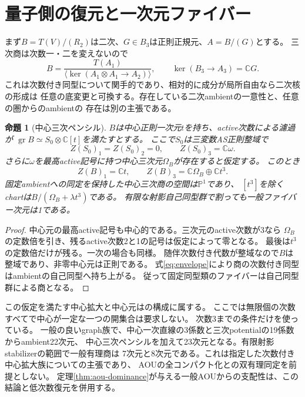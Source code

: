 \documentclass[11pt,a4paper]{ltjsarticle}
\newtheorem{proposition}[theorem]{命題}
\theoremstyle{definition}\newtheorem{remark}[theorem]{注意}
\newcommand{\PP}{\mathbb P}\newcommand{\kk}{\mathbb C}
\begin{document}
\section{量子側の復元と一次元ファイバー}\label{sec:surface-fiber}
まず$B=T(V)/(R_2)$は二次、$G\in B_3$は正則正規元、$A=B/(G)$とする。
三次商は次数一・二を変えないので
\begin{equation}\label{eq:envelope}
 B=\frac{T(A_1)}{\langle\ker(A_1\otimes A_1\to A_2)\rangle},\qquad
 \ker(B_3\to A_3)=\kk G.
\end{equation}
これは次数付き同型について関手的であり、相対的に成分が局所自由なら二次核の形成は
任意の底変更と可換する。存在している二次ambientの一意性と、任意の圏からのambientの
存在は別の主張である。

\begin{proposition}[中心三次ペンシル]\label{prop:center}
$B$は中心正則一次元$t$を持ち、active次数による濾過が
$\operatorname{gr}B\simeq S_0\otimes\kk[t]$を満たすとする。
ここで$S_0$は三変数AS正則整域で
\[
 Z(S_0)_1=Z(S_0)_2=0,\qquad Z(S_0)_3=\kk\omega.
\]
さらに$\omega$を最高active記号に持つ中心三次元$\Omega_B$が存在すると仮定する。
このとき
\[
 Z(B)_1=\kk t,\qquad Z(B)_3=\kk\Omega_B\oplus\kk t^3.
\]
固定ambientへの同定を保持した中心三次商の空間は$\PP^1$であり、
$[t^3]$を除くchartは$B/(\Omega_B+\lambda t^3)$である。
有限な射影自己同型群で割っても一般ファイバー次元は1である。
\end{proposition}
\begin{proof}
中心元の最高active記号も中心的である。三次元のactive次数が3なら
$\Omega_B$の定数倍を引き、残るactive次数2と1の記号は仮定によって零となる。
最後は$t^3$の定数倍だけが残る。一次の場合も同様。
随伴次数付き代数が整域なので$B$は整域であり、非零中心元は正則である。
式\eqref{eq:envelope}により商の次数付き同型はambientの自己同型へ持ち上がる。
従って固定同型類のファイバーは自己同型群による商となる。
\end{proof}

この仮定を満たす中心拡大と中心元は\cite{LBS,EG,Pym}の構成に属する。
ここでは無限個の次数すべてで中心が一定な一つの開集合は要求しない。
次数3までの条件だけを使っている。
一般の良いgraph族で、中心一次直線の3係数と三次potentialの19係数からambient22次元、
中心三次ペンシルを加えて23次元となる。有限射影stabilizerの範囲で一般有理商は
7次元と8次元である。これは指定した次数付き中心拡大族についての主張であり、
AOUの全コンパクト化との双有理同定を前提としない。
定理\ref{thm:aou-dominance}が与える一般AOUからの支配性は、この結論と低次数復元を併用する。
\end{document}
